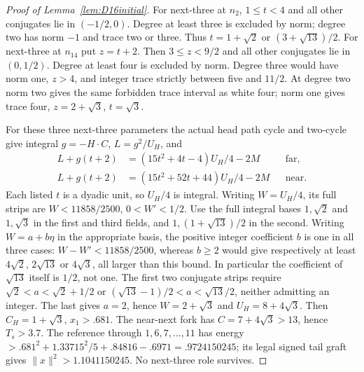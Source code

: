 \documentclass[11pt]{article}
\begin{document}
\begin{proof}[Proof of Lemma~\ref{lem:D16initial}]
For next-three at $n_2$, $1\le t<4$ and all other conjugates lie in
$(-1/2,0)$. Degree at least three is excluded by norm; degree two
has norm $-1$ and trace two or three. Thus
$t=1+\sqrt2$ or $(3+\sqrt{13})/2$.
For next-three at $n_{14}$ put $z=t+2$. Then $3\le z<9/2$ and
all other conjugates lie in $(0,1/2)$.
Degree at least four is excluded by norm. Degree three would have
norm one, $z>4$, and integer trace strictly between five and $11/2$.
At degree two norm two gives the same forbidden trace interval as
white four; norm one gives trace four, $z=2+\sqrt3$, $t=\sqrt3$.

For these three next-three parameters the actual head path cycle and
two-cycle give integral $g=-H\cdot C$, $L=g^2/U_H$, and
\[
\begin{aligned}
L+g(t+2)&=(15t^2+4t-4)U_H/4-2M&&\text{far},\\
L+g(t+2)&=(15t^2+52t+44)U_H/4-2M&&\text{near}.
\end{aligned}
\]
Each listed $t$ is a dyadic unit, so $U_H/4$ is integral.
Writing $W=U_H/4$, its full strips are
$W<11858/2500$, $0<W'<1/2$.
Use the full integral bases $1,\sqrt2$ and $1,\sqrt3$ in the
first and third fields, and $1,(1+\sqrt{13})/2$ in the second.
Writing $W=a+b\eta$ in the appropriate basis, the positive integer
coefficient $b$ is one in all three cases: $W-W'<11858/2500$,
whereas $b\ge2$ would give respectively at least
$4\sqrt2$, $2\sqrt{13}$ or $4\sqrt3$, all larger than this bound.
In particular the
coefficient of $\sqrt{13}$ itself is $1/2$, not one.
The first two conjugate strips require
$\sqrt2<a<\sqrt2+1/2$ or
$(\sqrt{13}-1)/2<a<\sqrt{13}/2$, neither admitting an integer.
The last gives $a=2$, hence $W=2+\sqrt3$ and $U_H=8+4\sqrt3$.
Then $C_H=1+\sqrt3$, $x_1>.681$.
The near-next fork has $C=7+4\sqrt3>13$, hence $T_s>3.7$.
The reference through $1,6,7,\ldots,11$ has energy
$>.681^2+1.33715^2/5+.84816-.6971=.9724150245$;
its legal signed tail graft gives
$\|x\|^2>1.1041150245$. No next-three role survives.


\end{proof}
\end{document}
